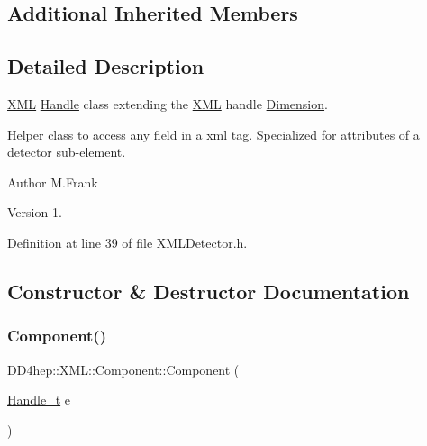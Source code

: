 \subsection*{Additional Inherited Members}


\subsection{Detailed Description}
\hyperlink{namespace_d_d4hep_1_1_x_m_l}{X\+ML} \hyperlink{class_d_d4hep_1_1_handle}{Handle} class extending the \hyperlink{namespace_d_d4hep_1_1_x_m_l}{X\+ML} handle \hyperlink{struct_d_d4hep_1_1_x_m_l_1_1_dimension}{Dimension}. 

Helper class to access any field in a xml tag. Specialized for attributes of a detector sub-\/element.

\begin{DoxyAuthor}{Author}
M.\+Frank 
\end{DoxyAuthor}
\begin{DoxyVersion}{Version}
1. 
\end{DoxyVersion}


Definition at line 39 of file X\+M\+L\+Detector.\+h.



\subsection{Constructor \& Destructor Documentation}
\hypertarget{struct_d_d4hep_1_1_x_m_l_1_1_component_aad3b73878abe65d69d7e53b4c2b043a0}{}\label{struct_d_d4hep_1_1_x_m_l_1_1_component_aad3b73878abe65d69d7e53b4c2b043a0} 
\subsubsection{\texorpdfstring{Component()}{Component()}\hspace{0.1cm}{\footnotesize\ttfamily [1/2]}}
{\footnotesize\ttfamily D\+D4hep\+::\+X\+M\+L\+::\+Component\+::\+Component (\begin{DoxyParamCaption}\item[{\hyperlink{class_d_d4hep_1_1_x_m_l_1_1_handle__t}{Handle\+\_\+t}}]{e }\end{DoxyParamCaption})\hspace{0.3cm}{\ttfamily [inline]}}



